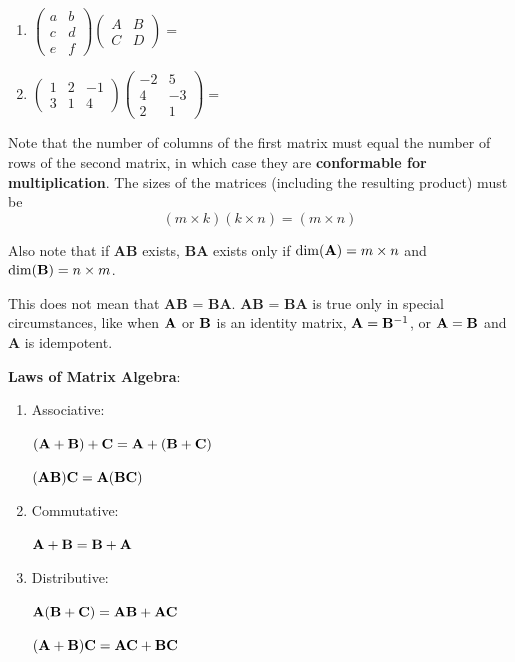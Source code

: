\documentclass[]{book}
\theoremstyle{definition}
\theoremstyle{definition}
\theoremstyle{definition}
\theoremstyle{remark}
\begin{document}
\begin{enumerate}
        \item $\begin{pmatrix} a&b\\c&d\\e&f \end{pmatrix} \begin{pmatrix} A&B\\C&D \end{pmatrix}
            = \phantom{\begin{pmatrix} aA+bC&aB+bD\\cA+dC&cB+dD\\eA+fC&eB+fD \end{pmatrix}}$ 
        
        \item $\begin{pmatrix} 1&2&-1\\3&1&4 \end{pmatrix} \begin{pmatrix} -2&5\\4&-3\\2&1\end{pmatrix} = 
            \phantom{\begin{pmatrix} 1(-2)+2(4)-1(2)&1(5)+2(-3)-1(1)\\
                3(-2)+1(4)+4(2)&3(5)+1(-3)+4(1)\end{pmatrix} =
            \begin{pmatrix} 4&-2\\6&16\end{pmatrix}}$
    \end{enumerate}

Note that the number of columns of the first matrix must equal the
number of rows of the second matrix, in which case they are
\textbf{conformable for multiplication}. The sizes of the matrices
(including the resulting product) must be
\[(m\times k)(k\times n)=(m\times n)\]

Also note that if \textbf{AB} exists, \textbf{BA} exists only if
\(\dim({\bf A}) = m \times n\) and \(\dim({\bf B}) = n \times m\).

This does not mean that \textbf{AB} = \textbf{BA}. \textbf{AB} =
\textbf{BA} is true only in special circumstances, like when \({\bf A}\)
or \({\bf B}\) is an identity matrix, \({\bf A} = {\bf B}^{-1}\), or
\({\bf A} = {\bf B}\) and \textbf{A} is idempotent.

\textbf{Laws of Matrix Algebra}:

\begin{enumerate}
        \item \parbox[t]{1.5in}{Associative:} $\bf (A+B)+C = A+(B+C)$\\
            \parbox[t]{1.5in}{\quad}  $\bf (AB)C = A(BC)$
        \item \parbox[t]{1.5in}{Commutative:} $\bf A+B=B+A$
        \item \parbox[t]{1.5in}{Distributive:} $\bf A(B+C)=AB+AC$\\
            \parbox[t]{1.5in}{\quad}   $\bf (A+B)C=AC+BC$
\end{enumerate}
\end{document}
